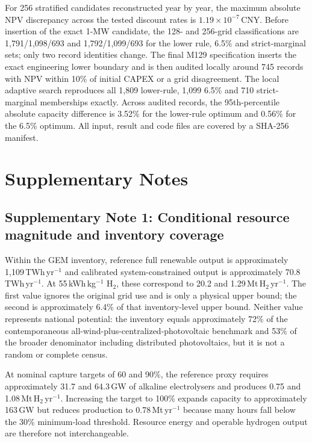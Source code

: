 \documentclass[11pt,a4paper]{article}
\begin{document}
For 256 stratified candidates reconstructed year by year, the maximum absolute NPV discrepancy across the tested discount rates is $1.19\times10^{-7}$\,CNY. Before insertion of the exact 1-MW candidate, the 128- and 256-grid classifications are 1,791/1,098/693 and 1,792/1,099/693 for the lower rule, 6.5\% and strict-marginal sets; only two record identities change. The final M129 specification inserts the exact engineering lower boundary and is then audited locally around 745 records with NPV within 10\% of initial CAPEX or a grid disagreement. The local adaptive search reproduces all 1,809 lower-rule, 1,099 6.5\% and 710 strict-marginal memberships exactly. Across audited records, the 95th-percentile absolute capacity difference is 3.52\% for the lower-rule optimum and 0.56\% for the 6.5\% optimum. All input, result and code files are covered by a SHA-256 manifest.

\FloatBarrier
\section*{Supplementary Notes}

\subsection*{Supplementary Note 1: Conditional resource magnitude and inventory coverage}

Within the GEM inventory, reference full renewable output is approximately 1,109\,TWh\,yr$^{-1}$ and calibrated system-constrained output is approximately 70.8\,TWh\,yr$^{-1}$. At 55\,kWh\,kg$^{-1}$ H$_2$, these correspond to 20.2 and 1.29\,Mt\,H$_2$\,yr$^{-1}$. The first value ignores the original grid use and is only a physical upper bound; the second is approximately 6.4\% of that inventory-level upper bound. Neither value represents national potential: the inventory equals approximately 72\% of the contemporaneous all-wind-plus-centralized-photovoltaic benchmark and 53\% of the broader denominator including distributed photovoltaics, but it is not a random or complete census.

At nominal capture targets of 60 and 90\%, the reference proxy requires approximately 31.7 and 64.3\,GW of alkaline electrolysers and produces 0.75 and 1.08\,Mt\,H$_2$\,yr$^{-1}$. Increasing the target to 100\% expands capacity to approximately 163\,GW but reduces production to 0.78\,Mt\,yr$^{-1}$ because many hours fall below the 30\% minimum-load threshold. Resource energy and operable hydrogen output are therefore not interchangeable.
\end{document}
